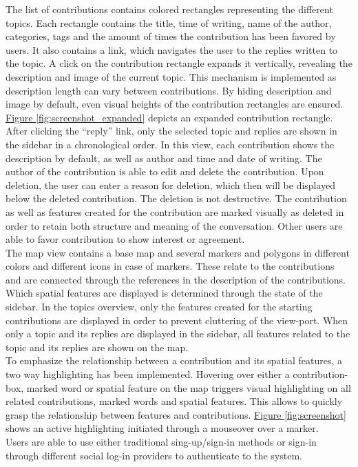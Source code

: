 The list of contributions contains colored rectangles representing the different topics. Each rectangle contains the title, time of writing, name of the author, categories, tags and the amount of times the contribution has been favored by users. It also contains a link, which navigates the user to the replies written to the topic. A click on the contribution rectangle expands it vertically, revealing the description and image of the current topic. This mechanism is implemented as description length can vary between contributions. By hiding description and image by default, even visual heights of the contribution rectangles are ensured. \hyperref[fig:screenshot_filter]{Figure \ref{fig:screenshot_expanded}} depicts an expanded contribution rectangle.\\
After clicking the ``reply'' link, only the selected topic and replies are shown in the sidebar in a chronological order. In this view, each contribution shows the description by default, as well as author and time and date of writing. The author of the contribution is able to edit and delete the contribution. Upon deletion, the user can enter a reason for deletion, which then will be displayed below the deleted contribution. The deletion is not destructive. The contribution as well as features created for the contribution are marked visually as deleted in order to retain both structure and meaning of the conversation. Other users are able to favor contribution to show interest or agreement.\\
The map view contains a base map and several markers and polygons in different colors and different icons in case of markers. These relate to the contributions and are connected through the references in the description of the contributions. Which spatial features are displayed is determined through the state of the sidebar. In the topics overview, only the features created for the starting contributions are displayed in order to prevent cluttering of the view-port. When only a topic and its replies are displayed in the sidebar, all features related to the topic and its replies are shown on the map.\\
To emphasize the relationship between a contribution and its spatial features, a two way highlighting has been implemented. Hovering over either a contribution-box, marked word or spatial feature on the map triggers visual highlighting on all related contributions, marked words and spatial features. This allows to quickly grasp the relationship between features and contributions. \hyperref[fig:screenshot]{Figure \ref{fig:screenshot}} shows an active highlighting initiated through a mouseover over a marker.\\
Users are able to use either traditional sing-up/sign-in methods or sign-in through different social log-in providers to authenticate to the system.

